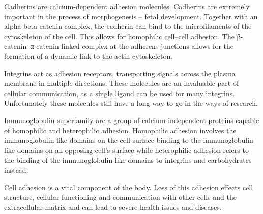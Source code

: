 \documentclass[
]{book}
\begin{document}
Cadherins are calcium-dependent adhesion molecules. Cadherins are extremely important in the process of morphogenesis -- fetal development. Together with an alpha-beta catenin complex, the cadherin can bind to the microfilaments of the cytoskeleton of the cell. This allows for homophilic cell--cell adhesion. The β-catenin--α-catenin linked complex at the adherens junctions allows for the formation of a dynamic link to the actin cytoskeleton.

Integrins act as adhesion receptors, transporting signals across the plasma membrane in multiple directions. These molecules are an invaluable part of cellular communication, as a single ligand can be used for many integrins. Unfortunately these molecules still have a long way to go in the ways of research.

Immunoglobulin superfamily are a group of calcium independent proteins capable of homophilic and heterophilic adhesion. Homophilic adhesion involves the immunoglobulin-like domains on the cell surface binding to the immunoglobulin-like domains on an opposing cell's surface while heterophilic adhesion refers to the binding of the immunoglobulin-like domains to integrins and carbohydrates instead.

Cell adhesion is a vital component of the body. Loss of this adhesion effects cell structure, cellular functioning and communication with other cells and the extracellular matrix and can lead to severe health issues and diseases.
\end{document}
